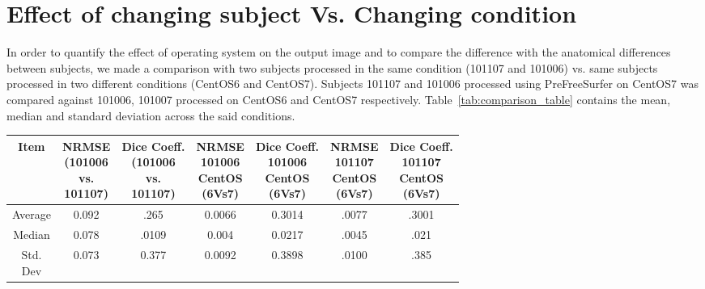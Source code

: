 \section{Effect of changing subject Vs. Changing condition}\label{sec:comparison}
In order to quantify the effect of operating system on the output image and to compare the difference with the anatomical differences between subjects, we made a comparison with two subjects processed in the same condition (101107 and 101006) vs. same subjects processed in two different conditions (CentOS6 and CentOS7). Subjects 101107 and 101006 processed using PreFreeSurfer on CentOS7 was compared against 101006, 101007 processed on CentOS6 and CentOS7 respectively. Table~\ref{tab:comparison_table} contains the mean, median and standard deviation across the said conditions.

\begin{center}
\begin{tabularx}{.98\textwidth}{|c|c|c|c|c|c|c|}
\hline
Item  & \makecell[l]{NRMSE\\(101006 \\ vs.\\101107)} & \makecell[l]{Dice Coeff.\\(101006\\ vs.\\101107)} & \makecell[l]{NRMSE\\101006\\CentOS\\(6Vs7)} & \makecell[l]{Dice Coeff.\\ 101006\\CentOS\\(6Vs7)} & \makecell[l]{NRMSE\\101107\\CentOS\\(6Vs7)} & \makecell[l]{Dice Coeff.\\ 101107\\CentOS\\(6Vs7)} \\ \hline
Average            & 0.092        & .265      & 0.0066     & 0.3014   & .0077   & .3001     \\ \hline
Median             & 0.078    & .0109       & 0.004          & 0.0217           & .0045     & .021  \\ \hline
\makecell[l]{Std.\\Dev} & 0.073     & 0.377           & 0.0092         & 0.3898   & .0100       & .385 \\ \hline
\end{tabularx}
\label{tab:comparison_table}
\end{center}

